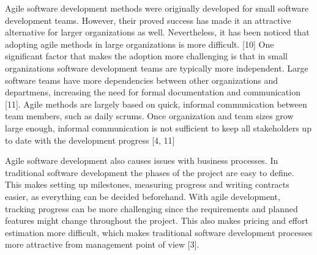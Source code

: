 Agile software development methods were originally developed for small
software development teams. However, their proved success has made it an
attractive alternative for larger organizations as well. Nevertheless,
it has been noticed that adopting agile methods in large organizations
is more difficult. [10] One significant factor
that makes the adoption more challenging is that in small organizations
software development teams are typically more independent. Large
software teams have more dependencies between other organizations
and departmens, increasing the need for formal documentation and
communication [11]. Agile methods are largely based
on quick, informal communication between team members, such as daily
scrums. Once organization and team sizes grow large enough, informal
communication is not sufficient to keep all stakeholders up to date with
the development progress [4, 11]

Agile software development also causes issues with business processes.
In traditional software development the phases of the project are easy
to define. This makes setting up milestones, measuring progress and
writing contracts easier, as everything can be decided beforehand. With
agile development, tracking progress can be more challenging since the
requirements and planned features might change throughout the project.
This also makes pricing and effort estimation more difficult, which
makes traditional software development processes more attractive from
management point of view [3].

